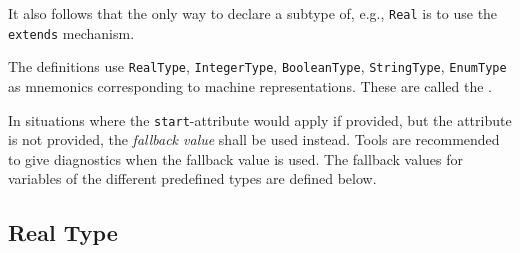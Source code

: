 \begin{nonnormative}
It also follows that the only way to declare a subtype of, e.g., \lstinline!Real! is to use the \lstinline!extends! mechanism.
\end{nonnormative}

The definitions use \lstinline!RealType!, \lstinline!IntegerType!, \lstinline!BooleanType!, \lstinline!StringType!, \lstinline!EnumType! as mnemonics corresponding to machine representations.
These are called the .

\begin{definition}\label{def:fallback-value}
In situations where the \lstinline!start!-attribute would apply if provided, but the attribute is not provided, the \emph{fallback value} shall be used instead.
Tools are recommended to give diagnostics when the fallback value is used.
The fallback values for variables of the different predefined types are defined below.
\end{definition}

\subsection{Real Type}\label{real-type}

